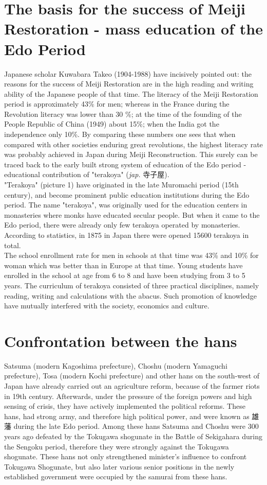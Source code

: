 \documentclass[11pt]{book}
\begin{document}
\section{The basis for the success of Meiji Restoration - mass education of the Edo Period}
Japanese scholar Kuwabara Takeo (1904-1988) have incisively pointed out: the reasons for the success of Meiji Restoration are in the high reading
and writing ability of the Japanese people of that time. The literacy of the Meiji Restoration period is approximately 43\% for men; whereas
in the France during the Revolution literacy was lower than 30 \%; at the time of the founding of the People Republic of China (1949) about 
15\%; when the India got the independence only 10\%. By comparing these numbers one sees 
that when compared with other societies enduring great revolutions, the highest literacy rate was probably achieved in Japan during Meiji
Reconstruction. This surely can be traced back to the early built strong system of education of the Edo period - educational 
contribution of "terakoya" (\textit{jap.}
 寺子屋).\\
"Terakoya" (picture 1) have originated in the late Muromachi period (15th century), and become prominent public education institutions
during the Edo period. The name "terakoya", was originally used for the education centers in monasteries where monks have educated secular
people. But when it came to the Edo period, there were already only few terakoya operated by monasteries. According to statistics, in 1875
in Japan there were opened 15600 terakoya in total.\\
The school enrollment rate for men in schools at that time was 43\% and 10\% for woman which was better than in Europe at that time. Young students
have enrolled in the school at age from 6 to 8 and have been studying from 3 to 5 years. The curriculum of terakoya consisted of three practical
disciplines, namely reading, writing and calculations with the abacus. Such promotion of knowledge have mutually interfered with the society, 
economics and culture.
\section{Confrontation between the hans}
Satsuma (modern Kagoshima prefecture), Choshu (modern Yamaguchi prefecture), Tosa (modern Kochi prefecture) and other hans on the south-west 
of Japan have already carried out an agriculture reform, because of the farmer riots in 19th century. Afterwards, under the pressure of the
foreign powers and high sensing of crisis, they have actively implemented the political reforms. These hans, had strong army, and therefore
high political power, and were known as 雄藩 during the late Edo period. Among these hans Satsuma
and Choshu were 300 years ago defeated by the Tokugawa shogunate in the Battle of Sekigahara during the Sengoku period, therefore they were
strongly against the Tokugawa shogunate. These hans not only strengthened minister's influence to confront Tokugawa Shogunate, but also later
various senior positions in the newly established government were occupied by the samurai from these hans.\\
\end{document}
